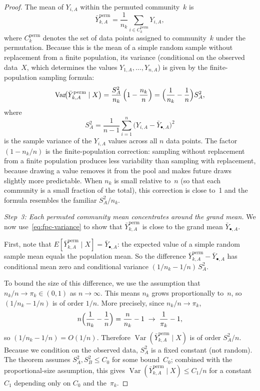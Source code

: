 \documentclass[hidelinks]{siamart251216}
\begin{document}
\begin{proof}
  The mean of $Y_{i,A}$ within the permuted community~$k$ is
  \[
    \bar{Y}_{k,A}^{\mathrm{perm}}
    = \frac{1}{n_k}\sum_{i \in C_k^{\mathrm{perm}}} Y_{i,A},
  \]
  where $C_k^{\mathrm{perm}}$ denotes the set of data points assigned
  to community~$k$ under the permutation.  Because this is the mean of
  a simple random sample without replacement from a finite population,
  its variance (conditional on the observed data~$X$, which determines
  the values $Y_{1,A}, \ldots, Y_{n,A}$) is given by the
  finite-population sampling formula:
  \begin{equation}\label{eq:fpc-variance}
    \operatorname{Var}\!\bigl(\bar{Y}_{k,A}^{\mathrm{perm}}
    \mid X\bigr)
    = \frac{S_A^2}{n_k}\,
      \Bigl(1 - \frac{n_k}{n}\Bigr)
    = \Bigl(\frac{1}{n_k} - \frac{1}{n}\Bigr) S_A^2,
  \end{equation}
  where
  \[
    S_A^2
    = \frac{1}{n - 1}\sum_{i=1}^n
      \bigl(Y_{i,A} - \bar{Y}_{\bullet,A}\bigr)^2
  \]
  is the sample variance of the $Y_{i,A}$ values across all $n$ data
  points.  The factor $(1 - n_k/n)$ is the finite-population correction:
  sampling without replacement from a finite population produces less
  variability than sampling with replacement, because drawing a value
  removes it from the pool and makes future draws slightly more
  predictable.  When $n_k$ is small relative to~$n$ (so that each
  community is a small fraction of the total), this correction is close
  to~1 and the formula resembles the familiar $S_A^2 / n_k$.

  \emph{Step~3: Each permuted community mean concentrates around the
  grand mean.}
  We now use~\eqref{eq:fpc-variance} to show that
  $\bar{Y}_{k,A}^{\mathrm{perm}}$ is close to the grand mean
  $\bar{Y}_{\bullet,A}$.

  First, note that
  $E[\bar{Y}_{k,A}^{\mathrm{perm}} \mid X] = \bar{Y}_{\bullet,A}$:
  the expected value of a simple random sample mean equals the
  population mean.  So the difference
  $\bar{Y}_{k,A}^{\mathrm{perm}} - \bar{Y}_{\bullet,A}$ has
  conditional mean zero and conditional variance
  $(1/n_k - 1/n)\, S_A^2$.

  To bound the size of this difference, we use the assumption that
  $n_k / n \to \pi_k \in (0, 1)$ as $n \to \infty$.  This means $n_k$ grows
  proportionally to~$n$, so $(1/n_k - 1/n)$ is of order $1/n$.
  More precisely, since $n_k/n \to \pi_k$,
  \[
    n\Bigl(\frac{1}{n_k} - \frac{1}{n}\Bigr)
    = \frac{n}{n_k} - 1
    \;\to\; \frac{1}{\pi_k} - 1,
  \]
  so $(1/n_k - 1/n) = O(1/n)$.
  Therefore
  $\operatorname{Var}(\bar{Y}_{k,A}^{\mathrm{perm}} \mid X)$ is of
  order $S_A^2 / n$.  Because we condition on the observed data, $S_A^2$
  is a fixed constant (not random).  The theorem assumes
  $S_A^2, S_B^2 \le C_0$ for some bound~$C_0$; combined with the
  proportional-size assumption, this gives
  $\operatorname{Var}(\bar{Y}_{k,A}^{\mathrm{perm}} \mid X) \le
  C_1 / n$ for a constant $C_1$ depending only on $C_0$ and
  the~$\pi_k$.


\end{proof}
\end{document}
